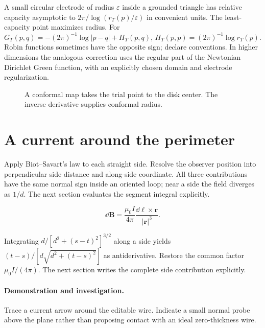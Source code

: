\documentclass[11pt,oneside,openany]{book}
\begin{document}
A small circular electrode of radius $\varepsilon$ inside a grounded
triangle has relative capacity asymptotic to
$2\pi/\log(r_T(p)/\varepsilon)$ in convenient units. The least-capacity
point maximizes radius.
For $G_T(p,q)=-(2\pi)^{-1}\log|p-q|+H_T(p,q)$,
$H_T(p,p)=(2\pi)^{-1}\log r_T(p)$.
Robin functions sometimes have the opposite sign; declare conventions.
In higher dimensions the analogous correction uses the regular part
of the Newtonian Dirichlet Green function, with an explicitly chosen
domain and electrode regularization.



\begin{figure}[htbp]\centering
{}
\caption[A conformal map takes the trial point to the disk center]{A conformal map takes the trial point to the disk center. The inverse derivative supplies conformal radius.}\label{fig:conformal}
\end{figure}

\section{A current around the perimeter}\label{sec:slide22}

Apply Biot--Savart's law to each straight side. Resolve the
observer position into perpendicular side distance and along-side
coordinate. All three contributions have the same normal sign
inside an oriented loop; near a side the field diverges as $1/d$.
The next section evaluates the segment integral explicitly.


\[\dd\mathbf B=\frac{\mu_0I}{4\pi}\frac{\dd\boldsymbol\ell\times\mathbf r}{|\mathbf r|^3}.\]


Integrating $d/[d^2+(s-t)^2]^{3/2}$ along a side yields
$(t-s)/[d\sqrt{d^2+(t-s)^2}]$ as antiderivative. Restore the common
factor $\mu_0I/(4\pi)$. The next section writes the complete side
contribution explicitly.



\paragraph{Demonstration and investigation.} Trace a current arrow around the editable wire. Indicate a small normal probe above the plane rather than proposing contact with an ideal zero-thickness wire.
\end{document}
